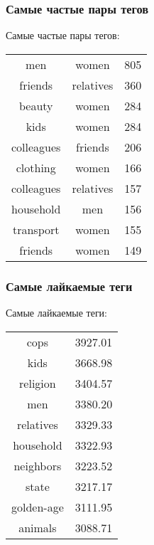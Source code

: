 \documentclass[14pt]{beamer}
\begin{document}
\begin{frame}[fragile]
	
	\frametitle{Самые частые пары тегов}
	
	\begin{center}
		Самые частые пары тегов:
		
		\begin{tabular}{c|c|c}
			men & women & 805 \\
			friends & relatives & 360 \\
			beauty & women & 284 \\
			kids & women & 284 \\
			colleagues & friends & 206 \\
			clothing & women & 166 \\
			colleagues & relatives & 157 \\
			household & men & 156 \\
			transport & women & 155 \\
			friends & women & 149 \\
		\end{tabular}
	\end{center}
	
\end{frame}

\begin{frame}[fragile]
	
	\frametitle{Самые лайкаемые теги}
	
	\begin{center}
		Самые лайкаемые теги:
		
		\begin{tabular}{c|c}
			cops & 3927.01 \\
			\colorbox{blue!30}{kids} & 3668.98 \\
			religion & 3404.57 \\
			\colorbox{blue!30}{men} & 3380.20 \\
			\colorbox{blue!30}{relatives} & 3329.33 \\
			household & 3322.93 \\
			neighbors & 3223.52 \\
			state & 3217.17 \\
			golden-age & 3111.95 \\
			animals & 3088.71 \\
		\end{tabular}
	\end{center}
	
\end{frame}
\end{document}
